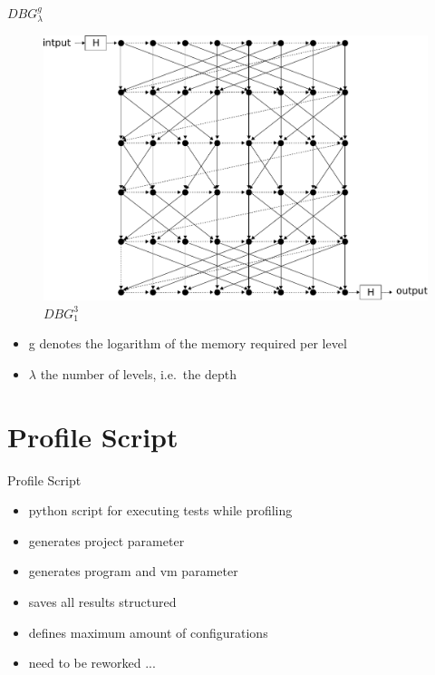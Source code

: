\documentclass[11pt,aspectratio=169]{beamer}
\begin{document}
\begin{frame}{$DBG^g_\lambda$}
  \begin{minipage}[H]{0.48\linewidth}
    \begin{figure}
      \includegraphics[width=\textwidth]{images/superconcentrator-nl-eps-converted-to.pdf}
      \caption{$DBG^3_1$}
    \end{figure}
  \end{minipage}
  \hfill%
  \begin{minipage}[H]{0.48\linewidth}
    \begin{itemize}
      \item g denotes the logarithm of the memory required per level
      \item $\lambda$ the number of levels, i.e.\ the depth
    \end{itemize}
  \end{minipage}
\end{frame}

\section{Profile Script}

\begin{frame}{Profile Script}
  \begin{itemize}
    \item python script for executing tests while profiling
    \item generates project parameter
    \item generates program and vm parameter
    \item saves all results structured
    \item defines maximum amount of configurations
    \item need to be reworked ...
  \end{itemize}
\end{frame}
\end{document}
